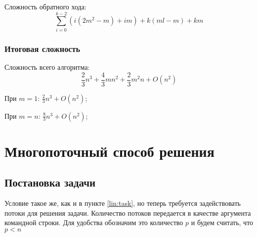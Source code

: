 \documentclass[12pt]{report}
\begin{document}
        Сложность обратного хода:
        \[ \sum^{k-2}_{i=0} (i(2m^2-m) + im) + k(ml - m) + km \]

        \subsection{Итоговая сложность}
        Сложность всего алгоритма: 
        \[\boxed{\frac{2}{3}n^3 + \frac{4}{3}mn^2 + \frac{2}{3}m^2n + O(n^2)} \]

        При $m = 1$: $\frac{2}{3}n^3 + O(n^2)$;

        При $m = n$: $\frac{8}{3}n^3 + O(n^2)$;
    
    \chapter{Многопоточный способ решения}
        \section{Постановка задачи} \label{thread:task}
        Условие такое же, как и в пункте \ref{lin:task}, но теперь требуется задействовать 
        потоки для решения задачи. Количество потоков передается в качестве аргумента командной
        строки. Для удобства обозначим это количество $p$ и будем считать, что $p < n$

        
\end{document}
